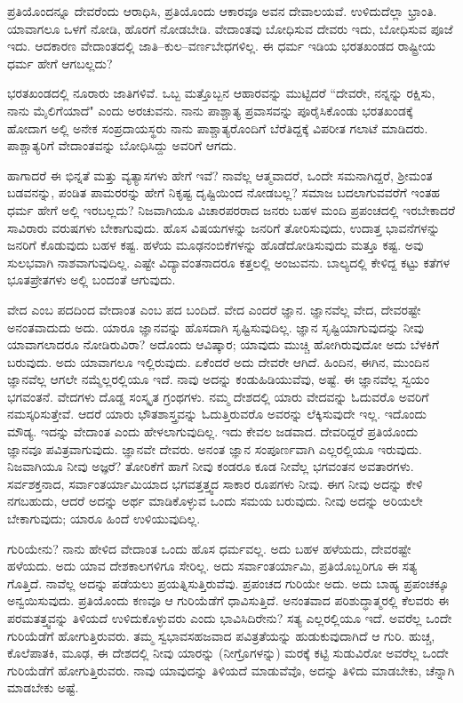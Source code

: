 ಪ್ರತಿಯೊಂದನ್ನೂ ದೇವರೆಂದು ಆರಾಧಿಸಿ, ಪ್ರತಿಯೊಂದು ಆಕಾರವೂ ಅವನ ದೇವಾಲಯವೆ. ಉಳಿದುದೆಲ್ಲಾ ಭ್ರಾಂತಿ. ಯಾವಾಗಲೂ ಒಳಗೆ ನೋಡಿ, ಹೊರಗೆ ನೋಡಬೇಡಿ. ವೇದಾಂತವು ಬೋಧಿಸುವ ದೇವರು ಇದು, ಬೋಧಿಸುವ ಪೂಜೆ ಇದು. ಆದಕಾರಣ ವೇದಾಂತದಲ್ಲಿ ಜಾತಿ–ಕುಲ–ವರ್ಣಬೇಧಗಳಿಲ್ಲ. ಈ ಧರ್ಮ ಇಡಿಯ ಭರತಖಂಡದ ರಾಷ್ಟ್ರೀಯ ಧರ್ಮ ಹೇಗೆ ಆಗಬಲ್ಲದು?

ಭರತಖಂಡದಲ್ಲಿ ನೂರಾರು ಜಾತಿಗಳಿವೆ. ಒಬ್ಬ ಮತ್ತೊಬ್ಬನ ಆಹಾರವನ್ನು ಮುಟ್ಟಿದರೆ “ದೇವರೇ, ನನ್ನನ್ನು ರಕ್ಷಿಸು, ನಾನು ಮೈಲಿಗೆಯಾದೆ" ಎಂದು ಅರಚುವನು. ನಾನು ಪಾಶ್ಚಾತ್ಯ ಪ್ರವಾಸವನ್ನು ಪೂರೈಸಿಕೊಂಡು ಭರತಖಂಡಕ್ಕೆ ಹೋದಾಗ ಅಲ್ಲಿ ಅನೇಕ ಸಂಪ್ರದಾಯಸ್ಥರು ನಾನು ಪಾಶ್ಚಾತ್ಯರೊಂದಿಗೆ ಬೆರೆತಿದ್ದಕ್ಕೆ ವಿಪರೀತ ಗಲಾಟೆ ಮಾಡಿದರು. ಪಾಶ್ಚಾತ್ಯರಿಗೆ ವೇದಾಂತವನ್ನು ಬೋಧಿಸಿದ್ದು ಅವರಿಗೆ ಆಗದು.

ಹಾಗಾದರೆ ಈ ಭಿನ್ನತೆ ಮತ್ತು ವ್ಯತ್ಯಾಸಗಳು ಹೇಗೆ ಇವೆ? ನಾವೆಲ್ಲ ಆತ್ಮವಾದರೆ, ಒಂದೇ ಸಮನಾಗಿದ್ದರೆ, ಶ‍್ರೀಮಂತ ಬಡವನನ್ನು, ಪಂಡಿತ ಪಾಮರರನ್ನು ಹೇಗೆ ನಿಕೃಷ್ಟ ದೃಷ್ಟಿಯಿಂದ ನೋಡಬಲ್ಲ? ಸಮಾಜ ಬದಲಾಗುವವರೆಗೆ ಇಂತಹ ಧರ್ಮ ಹೇಗೆ ಅಲ್ಲಿ ಇರಬಲ್ಲದು? ನಿಜವಾಗಿಯೂ ವಿಚಾರಪರರಾದ ಜನರು ಬಹಳ ಮಂದಿ ಪ್ರಪಂಚದಲ್ಲಿ ಇರಬೇಕಾದರೆ ಸಾವಿರಾರು ವರುಷಗಳು ಬೇಕಾಗುವುದು. ಹೊಸ ವಿಷಯಗಳನ್ನು ಜನರಿಗೆ ತೋರಿಸುವುದು, ಉದಾತ್ತ ಭಾವನೆಗಳನ್ನು ಜನರಿಗೆ ಕೊಡುವುದು ಬಹಳ ಕಷ್ಟ. ಹಳೆಯ ಮೂಢನಂಬಿಕೆಗಳನ್ನು ಹೊಡೆದೋಡಿಸುವುದು ಮತ್ತೂ ಕಷ್ಟ. ಅವು ಸುಲಭವಾಗಿ ನಾಶವಾಗುವುದಿಲ್ಲ. ಎಷ್ಟೇ ವಿದ್ಯಾವಂತನಾದರೂ ಕತ್ತಲಲ್ಲಿ ಅಂಜುವನು. ಬಾಲ್ಯದಲ್ಲಿ ಕೇಳಿದ್ದ ಕಟ್ಟು ಕತೆಗಳ ಭೂತಪ್ರೇತಗಳು ಅಲ್ಲಿ ಬಂದಂತೆ ಆಗುವುದು.

ವೇದ ಎಂಬ ಪದದಿಂದ ವೇದಾಂತ ಎಂಬ ಪದ ಬಂದಿದೆ. ವೇದ ಎಂದರೆ ಜ್ಞಾನ. ಜ್ಞಾನವೆಲ್ಲ ವೇದ, ದೇವರಷ್ಟೇ ಅನಂತವಾದುದು ಅದು. ಯಾರೂ ಜ್ಞಾನವನ್ನು ಹೊಸದಾಗಿ ಸೃಷ್ಟಿಸುವುದಿಲ್ಲ. ಜ್ಞಾನ ಸೃಷ್ಟಿಯಾಗುವುದನ್ನು ನೀವು ಯಾವಾಗಲಾದರೂ ನೋಡಿರುವಿರಾ? ಅದೊಂದು ಆವಿಷ್ಕಾರ; ಯಾವುದು ಮುಚ್ಚಿ ಹೋಗಿರುವುದೋ ಅದು ಬೆಳಕಿಗೆ ಬರುವುದು. ಅದು ಯಾವಾಗಲೂ ಇಲ್ಲಿರುವುದು. ಏಕೆಂದರೆ ಅದು ದೇವರೇ ಆಗಿದೆ. ಹಿಂದಿನ, ಈಗಿನ, ಮುಂದಿನ ಜ್ಞಾನವೆಲ್ಲ ಆಗಲೇ ನಮ್ಮೆಲ್ಲರಲ್ಲಿಯೂ ಇದೆ. ನಾವು ಅದನ್ನು ಕಂಡುಹಿಡಿಯುವೆವು, ಅಷ್ಟೆ. ಈ ಜ್ಞಾನವೆಲ್ಲ ಸ್ವಯಂ ಭಗವಂತನೆ. ವೇದಗಳು ದೊಡ್ಡ ಸಂಸ್ಕೃತ ಗ್ರಂಥಗಳು. ನಮ್ಮ ದೇಶದಲ್ಲಿ ಯಾರು ವೇದವನ್ನು ಓದುವರೊ ಅವರಿಗೆ ನಮಸ್ಕರಿಸುತ್ತೇವೆ. ಆದರೆ ಯಾರು ಭೌತಶಾಸ್ತ್ರವನ್ನು ಓದುತ್ತಿರುವರೊ ಅವರನ್ನು ಲೆಕ್ಕಿಸುವುದೇ ಇಲ್ಲ. ಇದೊಂದು ಮೌಡ್ಯ. ಇದನ್ನು ವೇದಾಂತ ಎಂದು ಹೇಳಲಾಗುವುದಿಲ್ಲ. ಇದು ಕೇವಲ ಜಡವಾದ. ದೇವರಿದ್ದರೆ ಪ್ರತಿಯೊಂದು ಜ್ಞಾನವೂ ಪವಿತ್ರವಾಗುವುದು. ಜ್ಞಾನವೇ ದೇವರು. ಅನಂತ ಜ್ಞಾನ ಸಂಪೂರ್ಣವಾಗಿ ಎಲ್ಲರಲ್ಲಿಯೂ ಇರುವುದು. ನಿಜವಾಗಿಯೂ ನೀವು ಅಜ್ಞರೆ? ತೋರಿಕೆಗೆ ಹಾಗೆ ನೀವು ಕಂಡರೂ ಕೂಡ ನೀವೆಲ್ಲ ಭಗವಂತನ ಅವತಾರಗಳು. ಸರ್ವಶಕ್ತನಾದ, ಸರ್ವಾಂತರ್ಯಾಮಿಯಾದ ಭಗವತ್ತತ್ತ್ವದ ಸಾಕಾರ ರೂಪಗಳು ನೀವು. ಈಗ ನೀವು ಅದನ್ನು ಕೇಳಿ ನಗಬಹುದು, ಆದರೆ ಅದನ್ನು ಅರ್ಥ ಮಾಡಿಕೊಳ್ಳುವ ಒಂದು ಸಮಯ ಬರುವುದು. ನೀವು ಅದನ್ನು ಅರಿಯಲೇ ಬೇಕಾಗುವುದು; ಯಾರೂ ಹಿಂದೆ ಉಳಿಯುವುದಿಲ್ಲ.

ಗುರಿಯೇನು? ನಾನು ಹೇಳಿದ ವೇದಾಂತ ಒಂದು ಹೊಸ ಧರ್ಮವಲ್ಲ. ಅದು ಬಹಳ ಹಳೆಯದು, ದೇವರಷ್ಟೇ ಹಳೆಯದು. ಅದು ಯಾವ ದೇಶಕಾಲಗಳಿಗೂ ಸೇರಿಲ್ಲ. ಅದು ಸರ್ವಾಂತರ್ಯಾಮಿ, ಪ್ರತಿಯೊಬ್ಬರಿಗೂ ಈ ಸತ್ಯ ಗೊತ್ತಿದೆ. ನಾವೆಲ್ಲ ಅದನ್ನು ಪಡೆಯಲು ಪ್ರಯತ್ನಿಸುತ್ತಿರುವೆವು. ಪ್ರಪಂಚದ ಗುರಿಯೇ ಅದು. ಅದು ಬಾಹ್ಯ ಪ್ರಪಂಚಕ್ಕೂ ಅನ್ವಯಿಸುವುದು. ಪ್ರತಿಯೊಂದು ಕಣವೂ ಆ ಗುರಿಯೆಡೆಗೆ ಧಾವಿಸುತ್ತಿದೆ. ಅನಂತವಾದ ಪರಿಶುದ್ಧಾತ್ಮರಲ್ಲಿ ಕೆಲವರು ಈ ಪರಮತತ್ತ್ವವನ್ನು ತಿಳಿಯದೆ ಉಳಿದುಕೊಳ್ಳುವರು ಎಂದು ಭಾವಿಸಿದಿರೇನು? ಸತ್ಯ ಎಲ್ಲರಲ್ಲಿಯೂ ಇದೆ. ಅವರೆಲ್ಲ ಒಂದೇ ಗುರಿಯೆಡೆಗೆ ಹೋಗುತ್ತಿರುವರು. ತಮ್ಮ ಸ್ವಭಾವಸಹಜವಾದ ಪವಿತ್ರತೆಯನ್ನು ಹುಡುಕುವುದಾಗಿದೆ ಆ ಗುರಿ. ಹುಚ್ಚ, ಕೊಲೆಪಾತಕಿ, ಮೂಢ, ಈ ದೇಶದಲ್ಲಿ ನೀವು ಯಾರನ್ನು (ನೀಗ್ರೊಗಳನ್ನು) ಮರಕ್ಕೆ ಕಟ್ಟಿ ಸುಡುವಿರೋ ಅವರೆಲ್ಲ ಒಂದೇ ಗುರಿಯೆಡೆಗೆ ಹೋಗುತ್ತಿರುವರು. ನಾವು ಯಾವುದನ್ನು ತಿಳಿಯದೆ ಮಾಡುವೆವೊ, ಅದನ್ನು ತಿಳಿದು ಮಾಡಬೇಕು, ಚೆನ್ನಾಗಿ ಮಾಡಬೇಕು ಅಷ್ಟೆ.

